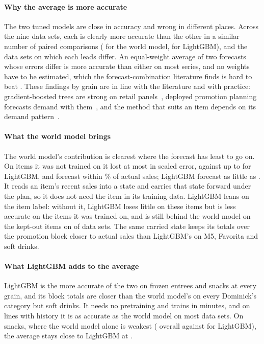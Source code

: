 \paragraph{Why the average is more accurate}
The two tuned models are close in accuracy and wrong in different places. Across
the nine data sets, each is clearly more accurate than the other in a similar
number of paired comparisons (\rqPWmLgbBetter{} for the world model, \rqPWmLgbWorse{} for LightGBM), and the
data sets on which each leads differ. An equal-weight average of two forecasts
whose errors differ is more accurate than either on most series, and no weights
have to be estimated, which the forecast-combination literature finds is hard to
beat \cite{smithwallis2009,wang2023}. These findings by grain are in line with
the literature and with practice: gradient-boosted trees are strong on retail
panels~\cite{m5accuracy}, deployed promotion planning forecasts
demand with them~\cite{pepsico2026}, and the method that suits an item depends on its demand
pattern~\cite{syntetos2005,ma2025}.

\paragraph{What the world model brings}
The world model's contribution is clearest where the forecast has least to go
on. On items it was not trained on it lost at most \rqCostWmItemHi{} in scaled error, against
up to \rqCostLgbItemHi{} for LightGBM, and forecast within \rqWmFaItemOff\% of actual sales; LightGBM
forecast as little as \rqLgbFaItemLoFrac{}. It reads an item's recent sales into a state
and carries that state forward under the plan, so it does not need the item in
its training data. LightGBM leans on the item label: without it, LightGBM loses
little on these items but is less accurate on the items it was trained on, and is
still behind the world model on the kept-out items on \rqWmBeatsNoid{} of \rqNoidSets{} data sets. The same carried state keeps its totals over the
promotion block closer to actual sales than LightGBM's on M5, Favorita and soft
drinks.

\paragraph{What LightGBM adds to the average}
LightGBM is the more accurate of the two on frozen entrees and snacks at every
grain, and its block totals are closer than the world model's on every
Dominick's category but soft drinks.
It needs no pretraining and trains in minutes, and on lines with history it is
as accurate as the world model on most data sets. On snacks, where the world
model alone is weakest (\rqSnaWm{} overall against \rqSnaLgb{} for LightGBM), the average
stays close to LightGBM at \rqSnaAvg{}.

